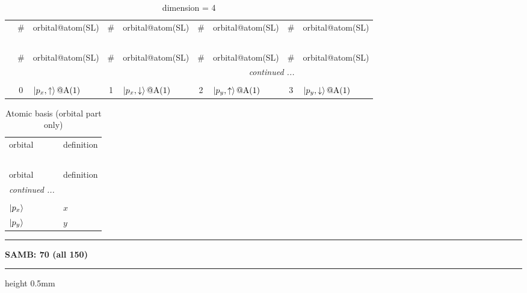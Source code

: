 \documentclass[fleqn,10pt,landscape]{jsarticle}
\begin{document}
\renewcommand{\arraystretch}{1.6}
\begin{longtable}[l]{c|cl|cl|cl|cl}
\captionsetup{justification=raggedright, singlelinecheck=off}
\caption{dimension = 4}
 \\
 \hline \hline
 & \# & orbital@atom(SL) & \# & orbital@atom(SL) & \# & orbital@atom(SL) & \# & orbital@atom(SL) \\ \hline \endfirsthead

\multicolumn{8}{l}{\tablename\ \thetable{}} \\
 \hline \hline
 & \# & orbital@atom(SL) & \# & orbital@atom(SL) & \# & orbital@atom(SL) & \# & orbital@atom(SL) \\ \hline \endhead

 \hline \hline
\multicolumn{8}{r}{\footnotesize\it continued ...} \\ \endfoot

 \hline \hline
\multicolumn{8}{r}{} \\ \endlastfoot

 & 0 & $\ket{p_{x},\uparrow}@{\rm A}(1)$ & 1 & $\ket{p_{x},\downarrow}@{\rm A}(1)$ & 2 & $\ket{p_{y},\uparrow}@{\rm A}(1)$ & 3 & $\ket{p_{y},\downarrow}@{\rm A}(1)$ \\
\end{longtable}
\renewcommand{\arraystretch}{1.6}
\begin{longtable}[l]{ll}
\captionsetup{justification=raggedright, singlelinecheck=off}
\caption{Atomic basis (orbital part only)}
 \\
 \hline \hline
orbital & definition \\ \hline \endfirsthead

\multicolumn{1}{l}{\tablename\ \thetable{}} \\
 \hline \hline
orbital & definition \\ \hline \endhead

 \hline \hline
\multicolumn{1}{r}{\footnotesize\it continued ...} \\ \endfoot

 \hline \hline
\multicolumn{1}{r}{} \\ \endlastfoot

$ \ket{p_{x}} $ & $ x $ \\
$ \ket{p_{y}} $ & $ y $ \\
\end{longtable}
\vspace{5mm}
\noindent \rule[0.5mm]{5mm}{0.5mm}\hspace{3mm}\textbf{SAMB: 70 (all 150)}\hspace{3mm}\leaders\hrule height 0.5mm\hfill\kern0pt
\vspace{3mm}
\end{document}
